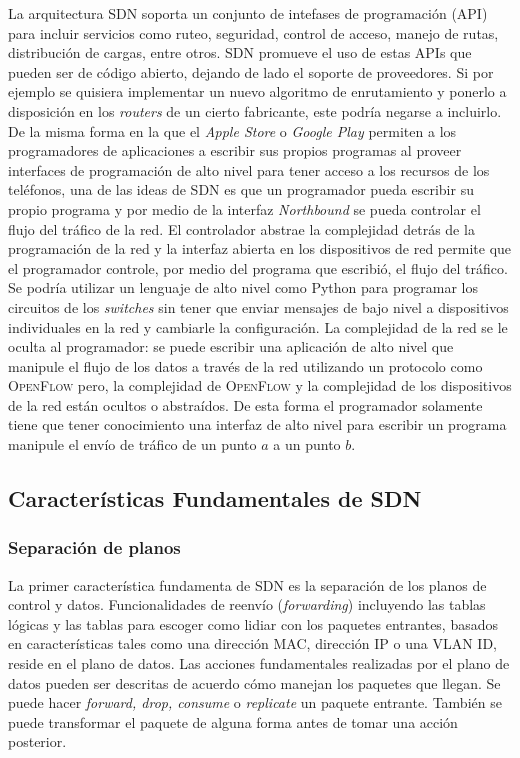 \documentclass[10pt,journal,compsoc]{IEEEtran}
\begin{document}
La arquitectura SDN soporta un conjunto de intefases de programación (API) para incluir servicios como ruteo, seguridad, control de acceso, manejo de rutas, distribución de cargas, entre otros. SDN promueve el uso de estas APIs que pueden ser de código abierto, dejando de lado el soporte de proveedores. Si por ejemplo se quisiera implementar un nuevo algoritmo de enrutamiento y ponerlo a disposición en los \emph{routers} de un cierto fabricante, este podría negarse a incluirlo. De la misma forma en la que el \emph{Apple Store} o \emph{Google Play} permiten a los programadores de aplicaciones a escribir sus propios programas al proveer interfaces de programación de alto nivel para tener acceso a los recursos de los teléfonos, una de las ideas de SDN es que un programador pueda escribir su propio programa y por medio de la interfaz \emph{Northbound} se pueda controlar el flujo del tráfico de la red. El controlador abstrae la complejidad detrás de la programación de la red y la interfaz abierta en los dispositivos de red permite que el programador controle, por medio del programa que escribió, el flujo del tráfico. Se podría utilizar un lenguaje de alto nivel como Python para programar los circuitos de los \emph{switches} sin tener que enviar mensajes de bajo nivel a dispositivos individuales en la red y cambiarle la configuración. La complejidad de la red se le oculta al programador: se puede escribir una aplicación de alto nivel que manipule el flujo de los datos a través de la red utilizando un protocolo como \textsc{OpenFlow} pero, la complejidad de \textsc{OpenFlow} y la complejidad de los dispositivos de la red están ocultos o abstraídos. De esta forma el programador solamente tiene que tener conocimiento una interfaz de alto nivel para escribir un programa manipule el envío de tráfico de un punto $a$ a un punto $b$.

\subsection{Características Fundamentales de SDN}

\subsubsection{Separación de planos}
La primer característica fundamenta de SDN es la separación de los planos de control y datos. Funcionalidades de reenvío (\emph{forwarding}) incluyendo las tablas lógicas y las tablas para escoger como lidiar con los paquetes entrantes, basados en características tales como una dirección MAC, dirección IP o una VLAN ID, reside en el plano de datos. Las acciones fundamentales realizadas por el plano de datos pueden ser descritas de acuerdo cómo manejan los paquetes que llegan. Se puede hacer \emph{forward, drop, consume} o \emph{replicate} un paquete entrante. También se puede transformar el paquete de alguna forma antes de tomar una acción posterior. 
\end{document}
